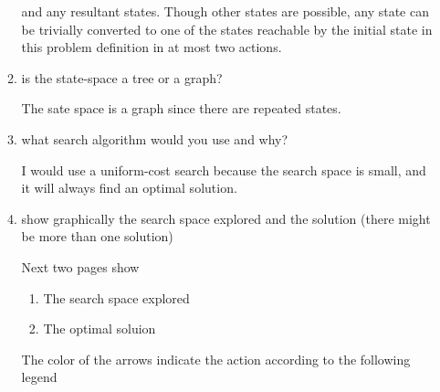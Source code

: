 \documentclass[11pt]{article}  %
\begin{document}
\begin{enumerate}
\begin{enumerate}
      and any resultant states.  Though other states are possible, any state can
      be trivially converted to one of the states reachable by the initial state
      in this problem definition in at most two actions.
      \item is the state-space a tree or a graph?
      \par
      The sate space is a graph since there are repeated states.
      \item what search algorithm would you use and why?
      \par 
      I would use a uniform-cost search because the search space is small, and
      it will always find an optimal solution.
      \item show graphically the search space explored and the solution (there
      might be more than one solution)
      \par
      Next two pages show 
        \begin{enumerate}
          \item The search space explored
          \item The optimal soluion
        \end{enumerate}
    The color of the arrows indicate the action according to the following
    legend
    \par{}
\end{enumerate}
\end{enumerate}
\end{document}
